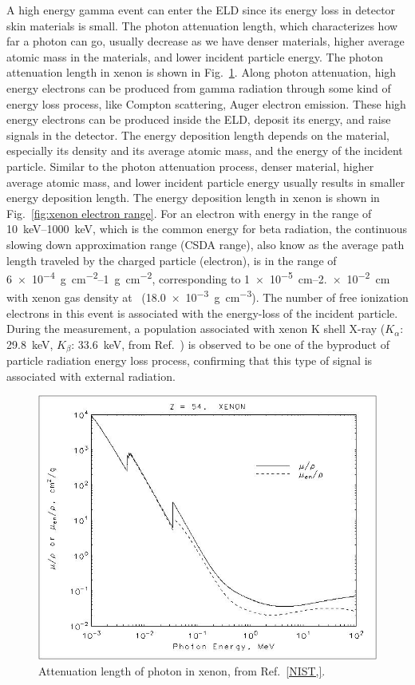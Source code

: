 A high energy gamma event can enter the ELD since its energy loss in detector skin materials is small. The photon attenuation length, which characterizes how far a photon can go, usually decrease as we have denser materials, higher average atomic mass in the materials, and lower incident particle energy. The photon attenuation length in xenon is shown in Fig.~\ref{fig:xenon photon attenuation}. Along photon attenuation, high energy electrons can be produced from gamma radiation through some kind of energy loss process, like Compton scattering, Auger electron emission. These high energy electrons can be produced inside the ELD, deposit its energy, and raise signals in the detector. The energy deposition length depends on the material, especially its density and its average atomic mass, and the energy of the incident particle. Similar to the photon attenuation process, denser material, higher average atomic mass, and lower incident particle energy usually results in smaller energy deposition length. The energy deposition length in xenon is shown in Fig.~\ref{fig:xenon electron range}. For an electron with energy in the range of \SIrange{10}{1000}{\keV}, which is the common energy for beta radiation, the continuous slowing down approximation range (CSDA range), also know as the average path length traveled by the charged particle (electron), is in the range of \SIrange{6e-4}{1}{\gram\per\cm\squared}, corresponding to \SIrange{1e-5}{2.e-2}{\cm} with xenon gas density at \standarddensity\ (\SI{18.0e-3}{\gram\per\cm\cubed}). %
The number of free ionization electrons in this event is associated with the energy-loss of the incident particle. During the measurement, a population associated with xenon K shell X-ray ($K_{\alpha}$: \SI{29.8}{\keV}, $K_{\beta}$: \SI{33.6}{\keV}, from Ref.~\cite{Dulieu2007, TabRadv8}) is observed to be one of the byproduct of particle radiation energy loss process, confirming that this type of signal is associated with external radiation.

\begin{figure}[!htbp]
	\centering
	\includegraphics[width=.7\textwidth,clip,trim={0 0 0 0},angle=0,origin=c]{Figures/GasTest/XenonPhysicsUseful/PhotonAttenuation.jpg}
	\caption[Attenuation length of photon in xenon.]{Attenuation length of photon in xenon, from Ref.~\ref{NIST,}.}
	\label{fig:xenon photon attenuation}
\end{figure}

